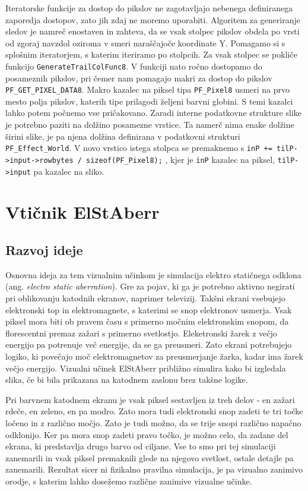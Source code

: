\documentclass[a4paper, 12pt]{book}
\begin{document}
Iteratorske funkcije za dostop do pikslov ne zagotavljajo nebenega definiranega zaporedja dostopov, zato jih zdaj ne moremo uporabiti.
Algoritem za generiranje sledov je namreč enostaven in zahteva, da se vsak stolpec pikslov obdela po vrsti od zgoraj navzdol oziroma v smeri naraščajoče koordinate Y.
Pomagamo si s splošnim iteratorjem, s katerim iteriramo po stolpcih.
Za vsak stolpec se pokliče funkcijo \verb!GenerateTrailColFunc8!.
V funkciji nato ročno dostopamo do posameznih pikslov, pri čemer nam pomagajo makri za dostop do pikslov \verb!PF_GET_PIXEL_DATA8!.
Makro kazalec na piksel tipa \verb!PF_Pixel8! usmeri na prvo mesto polja pikslov, katerih tipe prilagodi željeni barvni globini.
S temi kazalci lahko potem počnemo vse pričakovano. 
Zaradi interne podatkovne strukture slike je potrebno paziti na dolžino posamezne vrstice.
Ta namerč nima enake dolžine širini slike, je pa njena dolžina definirana v podatkovni strukturi \verb!PF_Effect_World!.
V novo vrstico istega stolpca se premaknemo s
\verb!inP += tilP->input->rowbytes / sizeof(PF_Pixel8);!
, kjer je \texttt{inP} kazalec na piksel, \verb!tilP->input! pa kazalec na sliko.




\section{Vtičnik ElStAberr}

\subsection{Razvoj ideje}

Osnovna ideja za tem vizualnim učinkom je simulacija elektro statičnega odklona (ang. {\it electro static aberration})\cite{elstaberr}.
Gre za pojav, ki ga je potrebno aktivno negirati pri oblikovanju katodnih ekranov, naprimer televizij.
Takšni ekrani vsebujejo elektronski top in elektromagnete, s katerimi se snop elektronov usmerja.
Vsak piksel mora biti ob pravem času  s primerno močnim elektronskim snopom, da florescentni premaz zažari s primerno svetlostjo.
Eleketronski žarek z večjo energijo pa potrenuje več energije, da se ga preusmeri.
Zato ekrani potrebujejo logiko, ki povečajo moč elektromagnetov za preusmerjanje žarka, kadar ima žarek večjo energijo.
Vizualni učinek ElStAberr približno simulira kako bi izgledala slika, če bi bila prikazana na katodnem zaslonu brez takšne logike.

Pri barvnem katodnem ekranu je vsak piksel sestavljen iz treh delov - en zažari rdeče, en zeleno, en pa modro. 
Zato mora tudi elektronski snop zadeti te tri točke ločeno in z različno močjo.
Zato je tudi možno, da se trije snopi različno napačno odklonijo.
Ker pa mora snop zadeti pravo točko, je možno celo, da zadane del ekrana, ki predstavlja drugo barvo od ciljane.
Vse to smo pri tej simulaciji zanemarili in vsak piksel premaknili glede na njegovo svetlost, ostale detajle pa zanemarili.
Rezultat sicer ni fizikalno pravilna simulacija, je pa vizualno zanimivo orodje, s katerim lahko dosežemo različne zanimive vizualne učinke.
\end{document}
